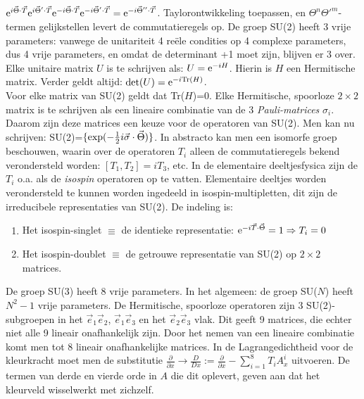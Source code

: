 ${\rm e}^{i\vec{\Theta}\cdot\vec{T}}{\rm e}^{i\vec{\Theta}'\cdot\vec{T}}{\rm e}^{-i\vec{\Theta}\cdot\vec{T}}
{\rm e}^{-i\vec{\Theta}'\cdot\vec{T}}={\rm e}^{-i\vec{\Theta}''\cdot\vec{T}}$.
Taylorontwikkeling toepassen, en $\Theta^n\Theta'^m$-termen gelijkstellen
levert de commutatieregels op.
\npar
De groep SU(2) heeft 3 vrije parameters: vanwege de unitariteit 4 re\"ele
condities op 4 complexe parameters, dus 4 vrije parameters, en omdat de
determinant +1 moet zijn, blijven er 3 over.
\npar
Elke unitaire matrix $U$ is te schrijven als: $U={\rm e}^{-iH}$. Hierin is $H$ een
Hermitische matrix. Verder geldt altijd: ${\rm det}(U)={\rm e}^{-i{\rm Tr}(H)}$.\\
Voor elke matrix van SU(2) geldt dat Tr($H$)=0. Elke Hermitische, spoorloze
$2\times2$ matrix is te schrijven als een lineaire combinatie van de 3
{\it Pauli-matrices} $\sigma_i$. Daarom zijn deze matrices een keuze voor de
operatoren van SU(2). Men kan nu schrijven:
SU(2)=$\{\exp(-\mbox{$\frac{1}{2}$} i\vec{\sigma}\cdot\vec{\Theta})\}$.
\npar
In abstracto kan men een isomorfe groep beschouwen, waarin over de
operatoren $T_i$ alleen de commutatieregels bekend verondersteld worden:
$[T_1,T_2]=iT_3$, etc.
\npar
In de elementaire deeltjesfysica zijn de $T_i$ o.a. als de {\it isospin}
operatoren op te vatten. Elementaire deeltjes worden verondersteld te kunnen
worden ingedeeld in isospin-multipletten, dit zijn de irreducibele
representaties van SU(2). De indeling is:
\begin{enumerate}
\item Het isospin-singlet $\equiv$ de identieke representatie: ${\rm e}^{-i\vec{T}\cdot\vec{\Theta}}=1\Rightarrow T_i=0$
\item Het isospin-doublet $\equiv$ de getrouwe representatie van SU(2) op $2\times2$ matrices.
\end{enumerate}
De groep SU(3) heeft 8 vrije parameters. In het algemeen: de groep SU($N$)
heeft $N^2-1$ vrije parameters. De Hermitische, spoorloze operatoren zijn 3
SU(2)-subgroepen in het $\vec{e}_1\vec{e}_2$, $\vec{e}_1\vec{e}_3$ en het
$\vec{e}_2\vec{e}_3$ vlak. Dit geeft 9 matrices, die echter niet alle 9
lineair onafhankelijk zijn. Door het nemen van een lineaire combinatie komt
men tot 8 lineair onafhankelijke matrices.
\npar
In de Lagrangedichtheid voor de kleurkracht moet men de substitutie
$\displaystyle\frac{\partial}{\partial x}\rightarrow\frac{D}{Dx}:=
\frac{\partial}{\partial x}-\sum_{i=1}^{8}T_iA^i_x$
\npar
uitvoeren. De termen van derde en vierde orde in $A$ die dit oplevert,
geven aan dat het kleurveld wisselwerkt met zichzelf.

